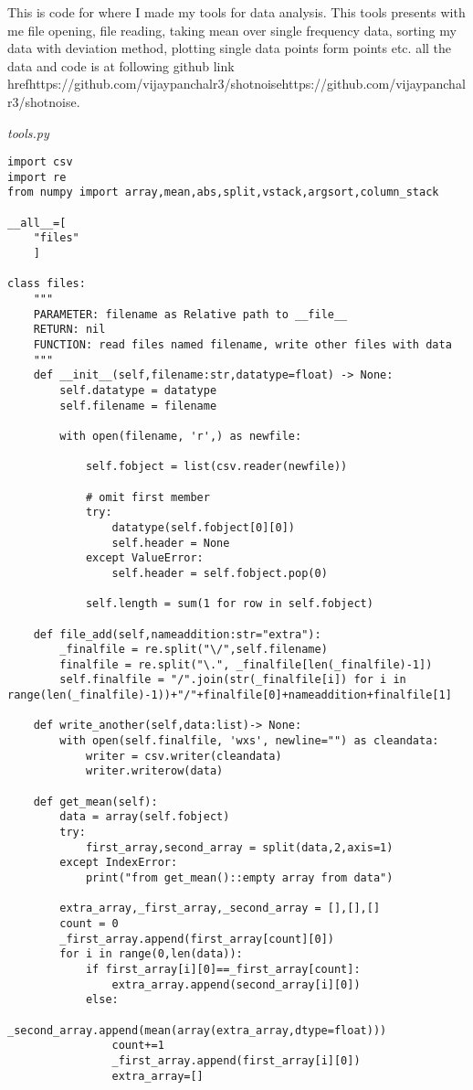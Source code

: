 
This is code for where I made my tools for data analysis. This tools presents with me file opening, file reading, taking mean over single frequency data, sorting my data with deviation method, plotting single data points form points etc. all the data and code is at following github link href{https://github.com/vijaypanchalr3/shotnoise}{https://github.com/vijaypanchalr3/shotnoise}. 

\emph{tools.py}

\begin{verbatim}
import csv
import re
from numpy import array,mean,abs,split,vstack,argsort,column_stack

__all__=[
    "files"
    ]

class files:
    """
    PARAMETER: filename as Relative path to __file__
    RETURN: nil
    FUNCTION: read files named filename, write other files with data
    """
    def __init__(self,filename:str,datatype=float) -> None:
        self.datatype = datatype
        self.filename = filename

        with open(filename, 'r',) as newfile:
            
            self.fobject = list(csv.reader(newfile))
            
            # omit first member
            try:
                datatype(self.fobject[0][0])
                self.header = None
            except ValueError:
                self.header = self.fobject.pop(0)
                
            self.length = sum(1 for row in self.fobject)
            
    def file_add(self,nameaddition:str="extra"):
        _finalfile = re.split("\/",self.filename)
        finalfile = re.split("\.", _finalfile[len(_finalfile)-1])
        self.finalfile = "/".join(str(_finalfile[i]) for i in range(len(_finalfile)-1))+"/"+finalfile[0]+nameaddition+finalfile[1]
    
    def write_another(self,data:list)-> None:
        with open(self.finalfile, 'wxs', newline="") as cleandata:
            writer = csv.writer(cleandata)
            writer.writerow(data)
    
    def get_mean(self):
        data = array(self.fobject)
        try:
            first_array,second_array = split(data,2,axis=1)
        except IndexError:
            print("from get_mean()::empty array from data")
            
        extra_array,_first_array,_second_array = [],[],[]
        count = 0
        _first_array.append(first_array[count][0])
        for i in range(0,len(data)):
            if first_array[i][0]==_first_array[count]:
                extra_array.append(second_array[i][0])
            else:
                _second_array.append(mean(array(extra_array,dtype=float)))
                count+=1
                _first_array.append(first_array[i][0])
                extra_array=[]


\end{verbatim}
